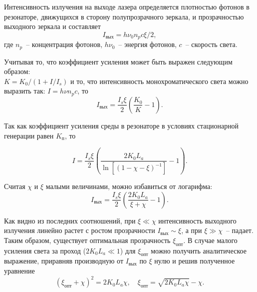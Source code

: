 
Интенсивность излучения на выходе лазера определяется плотностью фотонов в
резонаторе, движущихся в сторону полупрозрачного зеркала, и прозрачностью
выходного зеркала и составляет
\[
  I_\text{вых} = h\nu_0 n_p c\xi / 2,
\]
где \( n_p \)~-- концентрация фотонов, \( h\nu_0 \)~-- энергия фотонов,
\( c \)~-- скорость света.

Учитывая то, что коэффициент усиления может быть выражен следующим образом:\\
\( K = K_0 / (1 + I / I_s) \) и то, что интенсивность монохроматического света
можно выразить так: \( I = h\nu n_p c \), то
\[
  I_\text{вых} = \frac{I_s \xi}{2} \left( \frac{K_0}{K} - 1 \right).
\]

Так как коэффициент усиления среды в резонаторе в условиях стационарной
генерации равен \( K_\text{п} \), то

\begin{equation}
  I = \frac{I_s \xi}{2} \left( \frac{2K_0 L_a}{\ln\left[ (1 - \chi - \xi)^{-1}
    \right]} - 1\right).
  \label{eq_1.91}
\end{equation}

Считая \( \chi \) и \( \xi \) малыми величинами, можно избавиться от логарифма:
\[
  I_\text{вых} = \frac{I_s \xi}{2} \left( \frac{2K_0 L_a}{\xi + \chi} - 1
    \right).
\]

Как видно из последних соотношений, при \( \xi \ll \chi \) интенсивность
выходного излучения линейно растет с ростом прозрачности
\( I_\text{вых} \sim \xi \), а при \( \xi \gg \chi \)~-- падает. Таким образом,
существует оптимальная прозрачность \( \xi_\text{опт} \). В случае малого
усиления света за проход (\( 2K_0 L_a \ll 1 \)) для \( \xi_\text{опт} \) можно
получить аналитическое выражение, приравняв производную от \( I_\text{вых} \) по
\( \xi \) нулю и решив полученное уравнение
\[
    (\xi_\text{опт} + \chi)^2 = 2K_0 L_a\chi, \quad
    \xi_\text{опт} = \sqrt{2K_0 L_a\chi} - \chi.
\]
